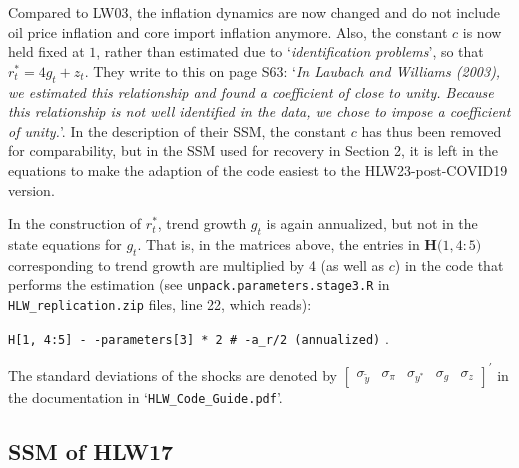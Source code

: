 \documentclass[a4paper,12pt]{article}
\begin{document}
Compared to LW03, the inflation dynamics are now changed and do not include
oil price inflation and core import inflation anymore. Also, the constant $c$
is now held fixed at $1$, rather than estimated due to `\emph{identification
problems}', so that $r_{t}^{\ast }=4g_{t}+z_{t}$. They write to this on page
S63: `\emph{In Laubach and Williams (2003), we estimated this relationship
and found a coefficient of close to unity. Because this relationship is not
well identified in the data, we chose to impose a coefficient of unity.}'.
In the description of their SSM, the constant $c$ has thus been removed for
comparability, but in the SSM used for recovery in Section 2, it is left in
the equations to make the adaption of the code easiest to the
HLW23-post-COVID19 version.

In the construction of $r_{t}^{\ast }$, trend growth $g_{t}$ is again
annualized, but not in the state equations for $g_{t}$. That is, in the
matrices above, the entries in $\mathbf{H(}1,4:5\mathbf{)}$ corresponding to
trend growth are multiplied by 4 (as well as $c$) in the code that performs
the estimation (see \texttt{unpack.parameters.stage3.R} in \texttt{%
HLW\_replication.zip} files, line 22, which reads):\ 

\texttt{H[1, 4:5] \TEXTsymbol{<}- -parameters[3] * 2 \# -a\_r/2 (annualized)}%
.

\noindent The standard deviations of the shocks are denoted by $%
\begin{bmatrix}
\sigma _{\tilde{y}} & \sigma _{\pi } & \sigma _{y^{\ast }} & \sigma _{g} & 
\sigma _{z}%
\end{bmatrix}%
^{\prime }$ in the documentation in `\texttt{HLW\_Code\_Guide.pdf}'.

\pagebreak

\subsection{SSM of HLW17}
\end{document}
